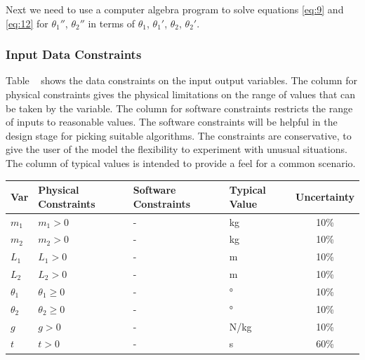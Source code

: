 \documentclass[12pt]{article}
\begin{document}
Next we need to use a computer algebra program to solve equations
\ref{eq:9} and \ref{eq:12} for $\theta_1''$, $\theta_2''$ in terms of $\theta_1$, $\theta_1'$, $\theta_2$, $\theta_2'$. 

\subsubsection{Input Data Constraints}\label{sec_inputDataCons}

Table ~ shows the data constraints on the input output
variables. The column for physical constraints gives the physical limitations
on the range of values that can be taken by the variable. The column for
software constraints restricts the range of inputs to reasonable values. The
software constraints will be helpful in the design stage for picking suitable
algorithms. The constraints are conservative, to give the user of the model the
flexibility to experiment with unusual situations. The column of typical values
is intended to provide a feel for a common scenario. 

\begin{table}[H]
  \caption{Input Variables} \label{TblInputVar}
  \renewcommand{\arraystretch}{1.2}
\noindent \begin{longtable*}{l l l l c} 
  \toprule
  \textbf{Var} & \textbf{Physical Constraints} & \textbf{Software Constraints} &
                             \textbf{Typical Value} & \textbf{Uncertainty}\\
  \midrule 
  $m_1$ & $m_1 > 0$ & - & \si[per-mode=symbol] {\kilogram} & 10\%
  \\
  $m_2$ & $m_2 > 0$ & - & \si[per-mode=symbol] {\kilogram} & 10\%
  \\
  $L_1$ & $L_1 > 0$ & - & \si[per-mode=symbol] {\metre} & 10\%
  \\
  $L_2$ & $L_2 > 0$ & - & \si[per-mode=symbol] {\metre} & 10\%
  \\
  $\theta_1$ & $\theta_1 \geq 0 $ & - & \si[per-mode=symbol] {\degree} & 10\%
  \\
  $\theta_2$ & $\theta_2 \geq 0 $ & - & \si[per-mode=symbol] {\degree} & 10\%
  \\
  $g$ & $g > 0$ & - & \si[per-mode=symbol] {\newton\per\kilogram} & 10\%
  \\
  $t$ & $t > 0$ & - & \si[per-mode=symbol] {\second} & 60\%
  \\
  \bottomrule
\end{longtable*}
\end{table}
\end{document}
